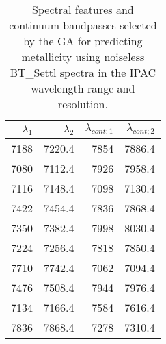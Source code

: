 \begin{appendix}

\begin{table}
\begin{center}
\begin{tabular}{rrrr}
  \hline
  $\lambda_1$ & $\lambda_2$ & $\lambda_{cont;1}$ & $\lambda_{cont;2} $ \\ 
  \hline
7188 & 7220.4 &	7854 & 7886.4 \\ 
7080 & 7112.4 &	7926 & 7958.4 \\
7116 & 7148.4 &	7098 & 7130.4 \\
7422 & 7454.4 &	7836 & 7868.4 \\
7350 & 7382.4 &	7998 & 8030.4 \\
7224 & 7256.4 &	7818 & 7850.4 \\
7710 & 7742.4 &	7062 & 7094.4 \\
7476 & 7508.4 &	7944 & 7976.4 \\
7134 & 7166.4 &	7584 & 7616.4 \\
7836 & 7868.4 &	7278 & 7310.4 \\
\hline
\end{tabular}
\caption {Spectral features and continuum bandpasses selected by the
  GA for predicting metallicity using noiseless BT\_Settl spectra in
  the IPAC wavelength range and resolution.} \label{tab:ipac-met-noiseless}
\end{center}
\end{table}


\end{appendix}
